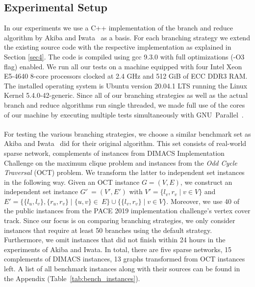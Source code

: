 \documentclass[12pt,a4paper,twoside]{scrartcl}
\numberwithin{equation}{section}
\begin{document}
\subsection{Experimental Setup}

In our experiments we use a C++ implementation of the branch and reduce algorithm by Akiba and Iwata~\cite{AkibaIwata} as a basis. For each branching strategy we extend the existing source code with the respective implementation as explained in Section \ref{sec4}. The code is compiled using gcc 9.3.0 with full optimizations (-O3 flag) enabled. We run all our tests on a machine equipped with four Intel Xeon E5-4640 8-core processors clocked at 2.4 GHz and 512 GiB of ECC DDR3 RAM. The installed operating system is Ubuntu version 20.04.1 LTS running the Linux Kernel 5.4.0-42-generic. Since all of our branching strategies as well as the actual branch and reduce algorithms run single threaded, we made full use of the cores of our machine by executing multiple tests simultaneously with GNU~Parallel~\cite{GNUP}. 

\paragraph{}
For testing the various branching strategies, we choose a similar benchmark set as Akiba and Iwata~\cite{AkibaIwata} did for their original algorithm. This set consists of real-world sparse network, complements of instances from DIMACS Implementation Challenge on the maximum clique problem \cite{DIMACS} and instances from the \emph{Odd Cycle Traversal} (OCT) problem. We transform the latter to independent set instances in the following way. Given an OCT instance $G=(V,E)$, we construct an independent set instance $G'~=(V', E')$ with $V' = \{l_v, r_v\;|\;v\in V\}$ and $E'=\{ \{l_u, l_v\}, \{r_u, r_v\}\;|\;\{u, v\}\in~ E\}\cup\{\{l_v,r_v\}\;|\;v\in V \}$. Moreover, we use 40 of the public instances from the PACE 2019 implementation challenge's vertex cover track. Since our focus is on comparing branching strategies, we only consider instances that require at least 50 branches using the default strategy. Furthermore, we omit instances that did not finish within 24 hours in the experiments of Akiba and Iwata. In total, there are five sparse networks, 15 complements of DIMACS instances, 13 graphs transformed from OCT instances left.  A list of all benchmark instances along with their sources can be found in the Appendix (Table~\ref{tab:bench_instances}). 
\end{document}
